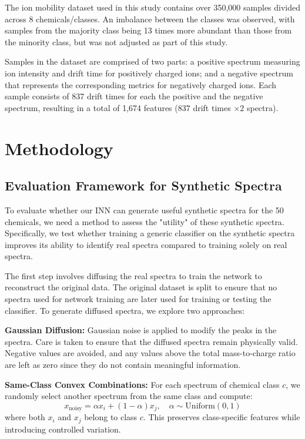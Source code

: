 \documentclass[sigconf]{acmart}
\begin{document}
The ion mobility dataset used in this study contains over 350,000 samples divided across 8 chemicals/classes. An imbalance between the classes was observed, with samples from the majority class being 13 times more abundant than those from the minority class, but was not adjusted as part of this study. 

Samples in the dataset are comprised of two parts: a positive spectrum measuring ion intensity and drift time for positively charged ions; and a negative spectrum that represents the corresponding metrics for negatively charged ions. Each sample consists of 837 drift times for each the positive and the negative spectrum, resulting in a total of 1,674 features ($837$ drift times $\times 2$ spectra).


\section{Methodology}

\subsection{Evaluation Framework for Synthetic Spectra}

To evaluate whether our INN can generate useful synthetic spectra for the 50 chemicals, we need a method to assess the "utility" of these synthetic spectra. Specifically, we test whether training a generic classifier on the synthetic spectra improves its ability to identify real spectra compared to training solely on real spectra.

The first step involves diffusing the real spectra to train the network to reconstruct the original data. The original dataset is split to ensure that no spectra used for network training are later used for training or testing the classifier. To generate diffused spectra, we explore two approaches:

\textbf{Gaussian Diffusion:} Gaussian noise is applied to modify the peaks in the spectra. Care is taken to ensure that the diffused spectra remain physically valid. Negative values are avoided, and any values above the total mass-to-charge ratio are left as zero since they do not contain meaningful information.

\textbf{Same-Class Convex Combinations:} For each spectrum of chemical class $c$, we randomly select another spectrum from the same class and compute:
\begin{equation}
    x_{\text{noisy}} = \alpha x_i + (1-\alpha) x_j, \quad \alpha \sim \text{Uniform}(0,1)
\end{equation}
where both $x_i$ and $x_j$ belong to class $c$. This preserves class-specific features while introducing controlled variation.
\end{document}
